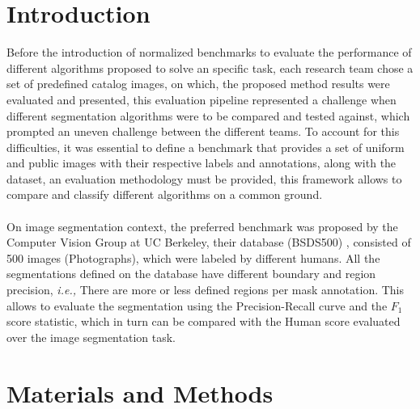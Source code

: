 \documentclass[10pt,twocolumn,letterpaper]{article}
\begin{document}
\section{Introduction}
Before the introduction of normalized benchmarks to evaluate the performance of different algorithms proposed to solve an specific task, each research team chose a set of predefined catalog images, on which, the proposed method results were evaluated and presented, this evaluation pipeline represented a challenge when different segmentation algorithms were to be compared and tested against, which prompted an uneven challenge between the different teams. To account for this difficulties, it was essential to define a benchmark that provides a set of uniform and public images with their respective labels and annotations, along with the dataset, an evaluation methodology must be provided, this framework allows to compare and classify different algorithms on a common ground. 
\\
\\
On image segmentation context, the preferred benchmark was proposed by the Computer Vision Group at UC Berkeley, their database (BSDS500) \cite{amfm_pami2011}, consisted of 500 images (Photographs), which were labeled by different humans. All the segmentations defined on the database have different boundary and region precision, \textit{i.e.,} There are more or less defined regions per mask annotation. This allows to evaluate the segmentation using the Precision-Recall curve and the $F_1$ score statistic, which in turn can be compared with the Human score evaluated over the image segmentation task.

\section{Materials and Methods}

\end{document}
